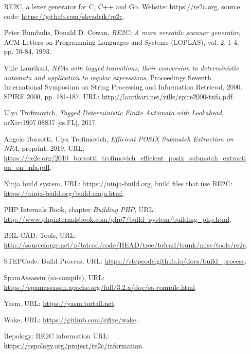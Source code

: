 \documentclass[preprint,12pt, a4paper]{elsarticle}
\begin{document}
\begin{thebibliography}{00}

    RE2C, a lexer generator for C, C++ and Go.
    Website: \url{https://re2c.org},
    source code: \url{https://github.com/skvadrik/re2c}.

    Peter Bumbulis,
    Donald D. Cowan,
    \textit{RE2C: A more versatile scanner generator},
    ACM Letters on Programming Languages and Systems (LOPLAS),
    vol. 2, 1-4,
    pp. 70-84,
    1993.

    Ville Laurikari,
    \textit{NFAs with tagged transitions, their conversion to deterministic automata and application to regular expressions},
    Proceedings Seventh International Symposium on String Processing and Information Retrieval, 2000. SPIRE 2000,
    pp. 181-187,
    URL: \url{http://laurikari.net/ville/spire2000-tnfa.pdf}.

    Ulya Trofimovich,
    \textit{Tagged Deterministic Finite Automata with Lookahead},
    arXiv:1907.08837 [cs.FL],
    2017.

    Angelo Borsotti, Ulya Trofimovich,
    \textit{Efficient POSIX Submatch Extraction on NFA},
    preprint, 2019,
    URL: \url{https://re2c.org/2019_borsotti_trofimovich_efficient_posix_submatch_extraction_on_nfa.pdf}.

    Ninja build system,
    URL: \url{https://ninja-build.org},
    build files that use RE2C: \url{https://ninja-build.org/build.ninja.html}.

    PHP Internals Book,
    chapter \textit{Building PHP},
    URL: \url{http://www.phpinternalsbook.com/php7/build_system/building_php.html}.

    BRL-CAD: Tools,
    URL: \url{http://sourceforge.net/p/brlcad/code/HEAD/tree/brlcad/trunk/misc/tools/re2c}.

    STEPCode: Build Process,
    URL: \url{https://stepcode.github.io/docs/build_process}.

    SpamAssassin (sa-compile),
    URL: \url{https://spamassassin.apache.org/full/3.2.x/doc/sa-compile.html}.

    Yasm,
    URL: \url{https://yasm.tortall.net}.

    Wake,
    URL: \url{https://github.com/sifive/wake}.

    Repology: RE2C information
    URL: \url{https://repology.org/project/re2c/information}.


\end{thebibliography}
\end{document}
